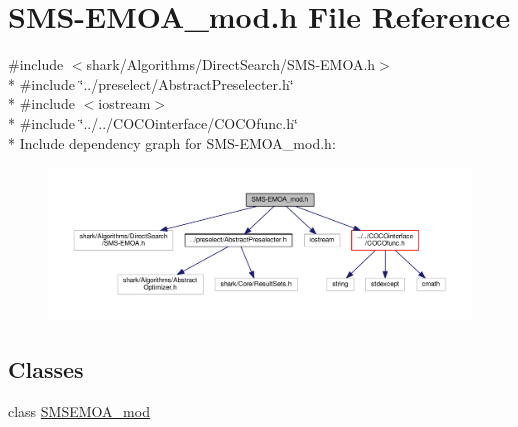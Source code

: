 \hypertarget{SMS-EMOA__mod_8h}{}\section{S\+M\+S-\/\+E\+M\+O\+A\+\_\+mod.h File Reference}
\label{SMS-EMOA__mod_8h}
{\ttfamily \#include $<$shark/\+Algorithms/\+Direct\+Search/\+S\+M\+S-\/\+E\+M\+O\+A.\+h$>$}\\*
{\ttfamily \#include \char`\"{}../preselect/\+Abstract\+Preselecter.\+h\char`\"{}}\\*
{\ttfamily \#include $<$iostream$>$}\\*
{\ttfamily \#include \char`\"{}../../\+C\+O\+C\+Ointerface/\+C\+O\+C\+Ofunc.\+h\char`\"{}}\\*
Include dependency graph for S\+M\+S-\/\+E\+M\+O\+A\+\_\+mod.h\+:
\nopagebreak
\begin{figure}[H]
\begin{center}
\leavevmode
\includegraphics[width=350pt]{SMS-EMOA__mod_8h__incl}
\end{center}
\end{figure}
\subsection*{Classes}
\begin{DoxyCompactItemize}
\item 
class \hyperlink{classSMSEMOA__mod}{S\+M\+S\+E\+M\+O\+A\+\_\+mod}
\end{DoxyCompactItemize}

